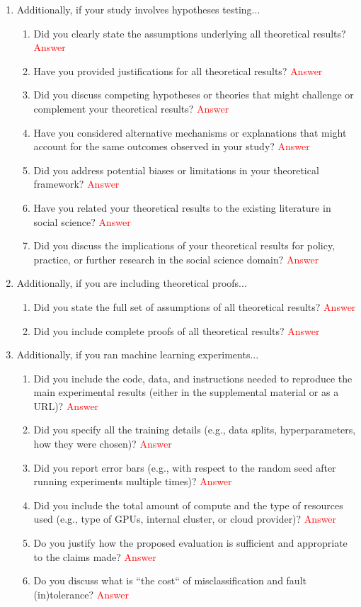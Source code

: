 \documentclass[letterpaper]{article} %
\newcommand{\answerTODO}[1]{\textcolor{red}{#1}}
\begin{document}
\begin{enumerate}
\item Additionally, if your study involves hypotheses testing...
\begin{enumerate}
  \item Did you clearly state the assumptions underlying all theoretical results?
    \answerTODO{Answer}
  \item Have you provided justifications for all theoretical results?
    \answerTODO{Answer}
  \item Did you discuss competing hypotheses or theories that might challenge or complement your theoretical results?
    \answerTODO{Answer}
  \item Have you considered alternative mechanisms or explanations that might account for the same outcomes observed in your study?
    \answerTODO{Answer}
  \item Did you address potential biases or limitations in your theoretical framework?
    \answerTODO{Answer}
  \item Have you related your theoretical results to the existing literature in social science?
    \answerTODO{Answer}
  \item Did you discuss the implications of your theoretical results for policy, practice, or further research in the social science domain?
    \answerTODO{Answer}
\end{enumerate}

\item Additionally, if you are including theoretical proofs...
\begin{enumerate}
  \item Did you state the full set of assumptions of all theoretical results?
    \answerTODO{Answer}
	\item Did you include complete proofs of all theoretical results?
    \answerTODO{Answer}
\end{enumerate}

\item Additionally, if you ran machine learning experiments...
\begin{enumerate}
  \item Did you include the code, data, and instructions needed to reproduce the main experimental results (either in the supplemental material or as a URL)?
    \answerTODO{Answer}
  \item Did you specify all the training details (e.g., data splits, hyperparameters, how they were chosen)?
    \answerTODO{Answer}
     \item Did you report error bars (e.g., with respect to the random seed after running experiments multiple times)?
    \answerTODO{Answer}
	\item Did you include the total amount of compute and the type of resources used (e.g., type of GPUs, internal cluster, or cloud provider)?
    \answerTODO{Answer}
     \item Do you justify how the proposed evaluation is sufficient and appropriate to the claims made? 
    \answerTODO{Answer}
     \item Do you discuss what is ``the cost`` of misclassification and fault (in)tolerance?
    \answerTODO{Answer}
  

\end{enumerate}
\end{enumerate}
\end{document}
